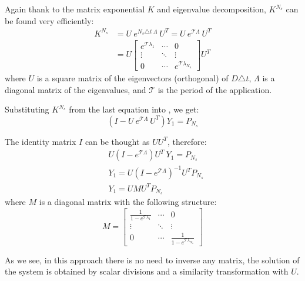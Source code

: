 Again thank to the matrix exponential $K$ and eigenvalue decomposition, $K^{N_s}$ can be found very efficiently:
\begin{align*}
  K^{N_s} & = U \: e^{N_s \triangle t \: \Lambda} \: U^T = U \: e^{\mathcal{T} \Lambda} \: U^T \\
    & = U \left[
      \begin{array}{ccc}
        e^{\mathcal{T} \lambda_1} & \cdots & 0 \\
        \vdots & \ddots & \vdots \\
        0 & \cdots & e^{\mathcal{T} \lambda_{N_n}}
      \end{array}
    \right] U^T
\end{align*}
where $U$ is a square matrix of the eigenvectors (orthogonal) of $D \triangle t$, $\Lambda$ is a diagonal matrix of the eigenvalues, and $\mathcal{T}$ is the period of the application.

Substituting $K^{N_s}$ from the last equation into , we get:
\[
  (I - U \: e^{\mathcal{T} \Lambda} \: U^T) Y_1 = P_{N_s}
\]

The identity matrix $I$ can be thought as $U U^T$, therefore:
\begin{align*}
  & U (I - e^{\mathcal{T} \Lambda}) U^T \: Y_1 = P_{N_s} \\
  & Y_1 = U (I - e^{\mathcal{T} \Lambda})^{-1} U^T P_{N_s} \\
  & Y_1 = U M U^T P_{N_s}
\end{align*}
where $M$ is a diagonal matrix with the following structure:
\[
  M = \left[
    \begin{array}{ccc}
      \frac{1}{1 - e^{\mathcal{T} \lambda_1}} & \cdots & 0 \\
      \vdots & \ddots & \vdots \\
      0 & \cdots & \frac{1}{1 - e^{\mathcal{T} \lambda_{N_n}}}
    \end{array}
  \right]
\]

As we see, in this approach there is no need to inverse any matrix, the solution of the system is obtained by scalar divisions and a similarity transformation with $U$.


